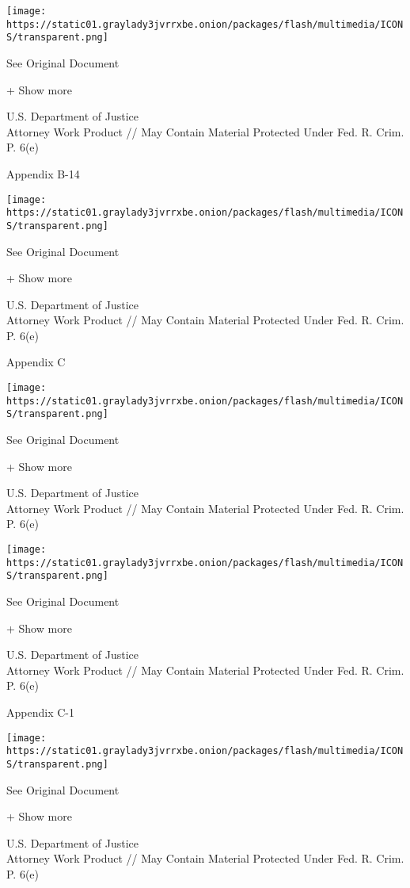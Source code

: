 \texttt{[image: https://static01.graylady3jvrrxbe.onion/packages/flash/multimedia/ICONS/transparent.png]}

See Original Document

+ Show more

U.S. Department of Justice\\
Attorney Work Product // May Contain Material Protected Under Fed. R.
Crim. P. 6(e)

Appendix B-14

\protect\hyperlink{}{}

\texttt{[image: https://static01.graylady3jvrrxbe.onion/packages/flash/multimedia/ICONS/transparent.png]}

See Original Document

+ Show more

U.S. Department of Justice\\
Attorney Work Product // May Contain Material Protected Under Fed. R.
Crim. P. 6(e)

Appendix C

\protect\hyperlink{}{}

\texttt{[image: https://static01.graylady3jvrrxbe.onion/packages/flash/multimedia/ICONS/transparent.png]}

See Original Document

+ Show more

U.S. Department of Justice\\
Attorney Work Product // May Contain Material Protected Under Fed. R.
Crim. P. 6(e)

\protect\hyperlink{}{}

\texttt{[image: https://static01.graylady3jvrrxbe.onion/packages/flash/multimedia/ICONS/transparent.png]}

See Original Document

+ Show more

U.S. Department of Justice\\
Attorney Work Product // May Contain Material Protected Under Fed. R.
Crim. P. 6(e)

Appendix C-1

\protect\hyperlink{}{}

\texttt{[image: https://static01.graylady3jvrrxbe.onion/packages/flash/multimedia/ICONS/transparent.png]}

See Original Document

+ Show more

U.S. Department of Justice\\
Attorney Work Product // May Contain Material Protected Under Fed. R.
Crim. P. 6(e)

